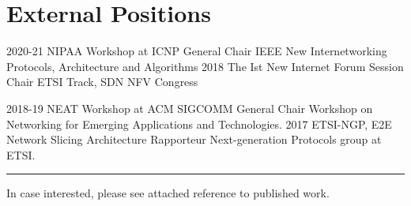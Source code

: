 \section{External Positions}
\begin{entrylist}
\entry
{2020-21}
{NIPAA Workshop at ICNP} 
{General Chair}
{IEEE New Internetworking Protocols, Architecture and Algorithms}
\entry
{2018}
{The Ist New Internet Forum} 
{Session Chair}
{ETSI Track, SDN NFV Congress}

\entry
{2018-19}
{NEAT Workshop at ACM SIGCOMM} 
{General Chair}
{Workshop on Networking for Emerging Applications and Technologies.}
\entry
{2017}
{ETSI-NGP, E2E Network Slicing Architecture} 
{Rapporteur}
{Next-generation Protocols group at ETSI.}
\end{entrylist}

\noindent
\rule{\textwidth}{0.4pt}
In case interested, please see attached reference to published work.
